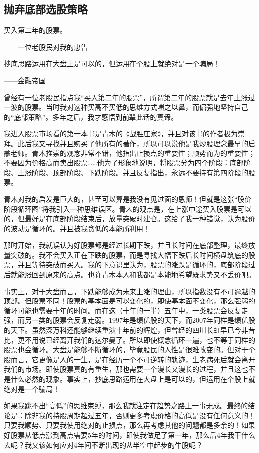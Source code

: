 \subsection{抛弃底部选股策略}

{\kaishu
买入第二年的股票。

\hfill ——一位老股民对我的忠告

抄底思路运用在大盘上是可以的，但运用在个股上就绝对是一个骗局！

\hfill ——金融帝国
}

曾经有一位老股民指点我“买入第二年的股票”，所谓第二年的股票就是去年上涨过一波的股票。当时我对这种买高不买低的思维方式嗤之以鼻，而倔强地坚持自己的“底部策略”。多年之后，我才感悟到前辈此话的真谛。

我进入股票市场看的第一本书是青木的《战胜庄家》，并且对该书的作者极为崇拜。此后我又寻找并且购买了他所有的著作，所以可以说他是我炒股理念最早的启蒙老师。青木推崇的观念非常不错，他指出止损点的重要性；顺势而为的重要性；不要因为价格高而卖出股票……他为了形象地说明，将股票分为四个阶段：底部阶段、上涨阶段、顶部阶段、下跌阶段。并且反复指出，永远不要持有第四阶段的股票。

青木对我的启发是巨大的，甚至可以算是我没有见过面的恩师！但就是这张“股价阶段循环图”将我引入一种思维误区。青木的观点是，在上涨中途买入股票是可以的，但最好是在底部阶段结束后，放量突破时建仓。这给了我一种错觉，认为股价的波动是循环的。并且被我贪低的本能所利用！

那时开始，我就误认为好股票都是经过长期下跌，并且长时间在底部整理，最终放量突破的。我不会买入正在下跌的股票，而是寻找大幅下跌后长时间横盘筑底的股票，并且等待突破而买入。我的下意识里认为，股票的涨跌是循环的，底部阶段过后就能涨回到原来的高点。也许青木本人和我都是本能地希望既求势又不丢价吧。

事实上，对于大盘而言，下跌能够成为未来上涨的理由，所以指数没有不可逾越的顶部。但股票不同！股票的基本面是可以变化的，即使基本面不变化，那么强弱的循环可能也需要十年的时间。而在这（十年的一半）五年中，一类股票会反复走强，而另一类的股票会反复走弱。1997年是绩优股的天下，而2007年同样是绩优股的天下。虽然深万科还能够继续重演十年前的辉煌，但曾经的四川长虹早已今非昔比，更不用说已经离开我们的达尔曼了。所以即使概念循环一遍，也不等于同样的股票也会循环。大盘是能够不断循环的，毕竟股民的人性是很难改变的。但对于个股而言，它更像是人的一生，是在经历一个不可逆转的轨迹，生老病死后就会离开我们的市场。即使股票真的有重生，那也需要一个漫长又漫长的过程，并且这也不是什么必然的现象。事实上，抄底思路运用在大盘上是可以的，但运用在个股上就绝对是一个骗局！

如果我跳不出“高低”的思维束缚，那么我就注定在趋势之路上一事无成。最终的结论是：除非我的持股周期超过五年，否则更多考虑价格的高低是没有任何意义的！只要我顺势、只要我使用绝对的止损点，那么再考虑其他的问题都是多余的！如果好股票从低点涨到高点需要5年的时间，即使我做足了第一年，那么后4年我干什么去呢？我又该如何应对4年间不断出现的从半空中起步的牛股呢？

